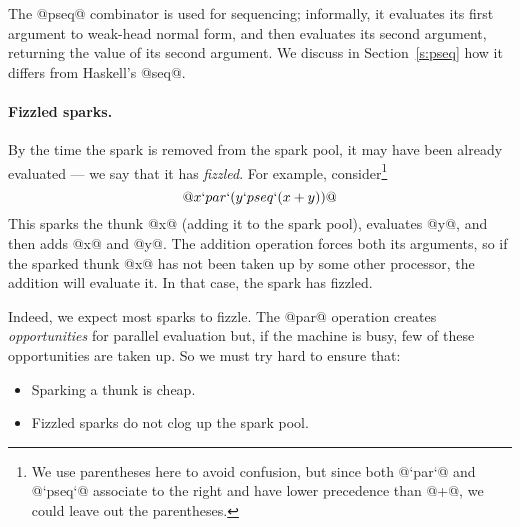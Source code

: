 \documentclass[twocolumn,9pt]{sigplanconf}
\begin{document}
The @pseq@ combinator is used for sequencing; informally, it evaluates
its first argument to weak-head normal form, and then evaluates its
second argument, returning the value of its second argument.  
We discuss in Section~\ref{s:pseq} how it differs from Haskell's @seq@.

\paragraph{Fizzled sparks.}

By the time the spark is removed from the spark pool, it may have been already
evaluated --- we say that it has \emph{fizzled}.  For example,
consider\footnote{We use parentheses here to avoid confusion, but
  since both @`par`@ and @`pseq`@ associate to the right and have
  lower precedence than @+@, we could leave out the parentheses.}
$$@x `par` (y `pseq` (x+y))@$$
This sparks the thunk @x@ (adding it to the spark pool), 
evaluates @y@, and then adds @x@ and @y@.  The addition
operation forces both its arguments, so if the sparked thunk 
@x@ has not been taken up by some other processor,
the addition will evaluate it.  In that case, the spark
has fizzled.  

Indeed, we expect most sparks to fizzle.  
The @par@ operation creates \emph{opportunities} for
parallel evaluation but, if the machine is busy, few of these opportunities
are taken up.  So we must try hard to ensure that:
\begin{itemize}
\item Sparking a thunk is cheap. 
\item Fizzled sparks do not clog up the spark pool.
\end{itemize}
\end{document}
